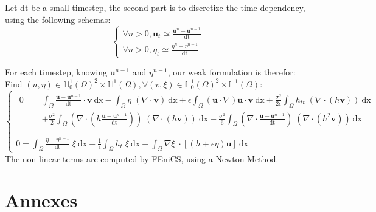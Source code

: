 \documentclass[11pt,a4paper]{article}
\begin{document}
Let $\mathrm{dt}$ be a small timestep, the second part is to discretize the time dependency, using the following schemas:	
\begin{equation}
\left\lbrace
		\begin{array}{l}
\displaystyle \forall n > 0, \mathbf{u}_t \simeq \frac{\mathbf{u}^n - \mathbf{u}^{n-1}}{\mathrm{dt}}  \\
\displaystyle \forall n > 0, \eta_t \simeq \frac{\eta^n - \eta^{n-1}}{\mathrm{dt}}  
		\end{array}
	\right.
\end{equation}

For each timestep, knowing $\mathbf{u}^{n-1}$ and $\eta^{n-1}$, our weak formulation is therefor: Find $(u,\eta) \in \mathbb{H}^1_0(\Omega)^2 \times \mathbb{H}^1(\Omega), \forall (v,\xi) \in \mathbb{H}^1_0(\Omega)^2 \times \mathbb{H}^1(\Omega)$: 
\begin{equation}
	\left\lbrace
		\begin{array}{l}
			\begin{split}
0 = &\int_{\Omega} \! \frac{\mathbf{u} - \mathbf{u}^{n-1}}{\mathrm{dt}} \cdot \mathbf{v} \: \mathrm{dx} - \int_{\Omega} \! \eta \; (\nabla \cdot \mathbf{v}) \: \mathrm{dx} + \epsilon \! \int_{\Omega} \! (\mathbf{u} \cdot \nabla ) \mathbf{u} \cdot \mathbf{v} \: \mathrm{dx} + \frac{\sigma^2}{2 \epsilon} \! \int_{\Omega} \!  h_{tt}  \; (\nabla \cdot( h \mathbf{v})) \: \mathrm{dx} \\ 
&+ \frac{\sigma^2}{2} \! \int_{\Omega} \!  (\nabla \cdot (h \frac{\mathbf{u} - \mathbf{u}^{n-1}}{\mathrm{dt}})) \; (\nabla \cdot (h \mathbf{v}) )\: \mathrm{dx} - \frac{\sigma^2}{6} \! \int_{\Omega} \! (\nabla \cdot \frac{\mathbf{u} - \mathbf{u}^{n-1}}{\mathrm{dt}}) \; (\nabla  \cdot (h^2  \mathbf{v})) \: \mathrm{dx} \\
			\end{split}\\
\displaystyle 0 = \int_{\Omega}\! \frac{\eta - \eta^{n-1}}{\mathrm{dt}} \; \xi \: \mathrm{dx} +\frac{1}{\epsilon}\int_{\Omega}\! h_t \; \xi \: \mathrm{dx}
-\int_{\Omega}\! \nabla \xi \; \cdot [(h+\epsilon\eta) \mathbf{u}]  \: \mathrm{dx}
		\end{array}
	\right.
\end{equation}
The non-linear terms are computed by FEniCS, using a Newton Method.


\pagebreak
\section*{Annexes}
\pagebreak

 


\appendix
\end{document}
